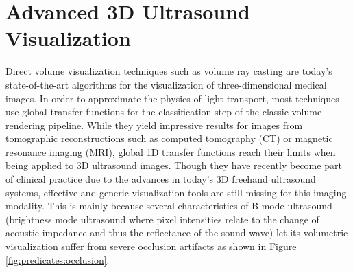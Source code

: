 %
\chapter{Advanced 3D Ultrasound Visualization}
\label{predicates}


Direct volume visualization techniques such as volume ray casting are today's state-of-the-art algorithms for the visualization of three-dimensional medical images. 
In order to approximate the physics of light transport, most techniques use global transfer functions for the classification step of the classic volume rendering pipeline. 
While they yield impressive results for images from tomographic reconstructions such as computed tomography (CT) or magnetic resonance imaging (MRI), global 1D transfer functions reach their limits when being applied to 3D ultrasound images.
Though they have recently become part of clinical practice due to the advances in today's 3D freehand ultrasound systems, effective and generic visualization tools are still missing for this imaging modality.
This is mainly because several characteristics of B-mode ultrasound (brightness mode ultrasound where pixel intensities relate to the change of acoustic impedance and thus the reflectance of the sound wave) let its volumetric visualization suffer from severe occlusion artifacts as shown in Figure \ref{fig:predicates:occlusion}. 

